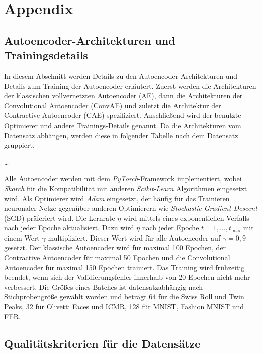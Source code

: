 
\chapter{Appendix}
\label{ch:Appendix}

\section{Autoencoder-Architekturen und Trainingsdetails}
\label{ch:Appendix:Architektur-Details}
In diesem Abschnitt werden Details zu den Autoencoder-Architekturen und Details zum Training der Autoencoder erläutert. Zuerst werden die Architekturen der klassischen vollvernetzten Autoencoder (AE), dann die Architekturen der Convolutional Autoencoder (ConvAE) und zuletzt die Architektur der Contractive Autoencoder (CAE) spezifiziert. Anschließend wird der benutzte Optimierer und andere Trainings-Details genannt. Da die Architekturen
vom Datensatz abhängen, werden diese in folgender Tabelle nach dem Datensatz gruppiert.

\ldots

Alle Autoencoder werden mit dem \textit{PyTorch}-Framework implementiert, wobei \textit{Skorch} für
die Kompatibilität mit anderen \textit{Scikit-Learn} Algorithmen eingesetzt wird. Als Optimierer
wird \textit{Adam} eingesetzt, der häufig für das Trainieren neuronaler Netze gegenüber anderen
Optimierern wie \textit{Stochastic Gradient Descent} (SGD) präferiert wird. Die Lernrate $\eta$
wird mittels eines exponentiellen Verfalls nach jeder Epoche aktualisiert. Dazu wird $\eta$ nach
jeder Epoche $t = 1, \ldots, t_{\text{max}}$ mit einem Wert $\gamma$ multipliziert. Dieser Wert
wird für alle Autoencoder auf $\gamma = 0,9$ gesetzt. Der klassische Autoencoder wird für maximal
100 Epochen, der Contractive Autoencoder für maximal 50 Epochen und die Convolutional Autoencoder
für maximal 150 Epochen trainiert. Das Training wird frühzeitig beendet, wenn sich der
Validierungsfehler innerhalb von 20 Epochen nicht mehr verbessert. Die Größes eines Batches ist
datensatzabhängig nach Stichprobengröße gewählt worden und beträgt 64 für die Swiss Roll und Twin
Peaks, 32 für Olivetti Faces und ICMR, 128 für MNIST, Fashion MNIST und FER.

\section{Qualitätskriterien für die Datensätze}
\label{ch:Appendix:Qualitaetskriterien}

